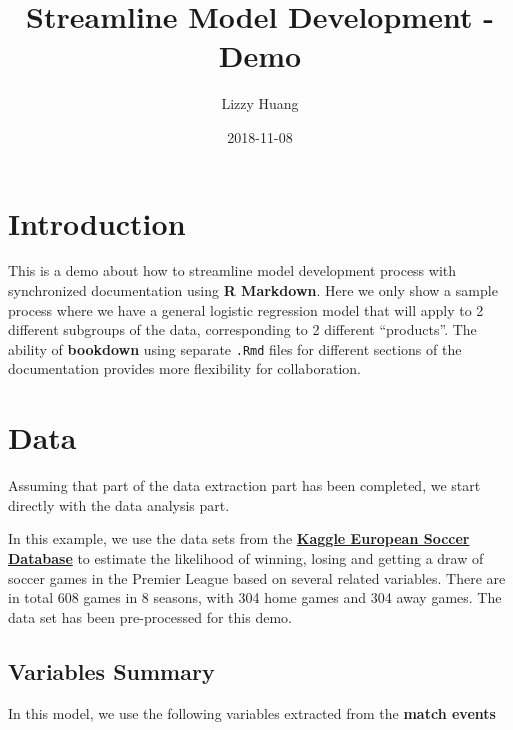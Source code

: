 \documentclass[]{book}
\title{Streamline Model Development - Demo}
\author{Lizzy Huang}
\date{2018-11-08}
\theoremstyle{definition}
\theoremstyle{definition}
\theoremstyle{definition}
\theoremstyle{remark}
\begin{document}
\maketitle

{
\setcounter{tocdepth}{1}
\tableofcontents
}
\chapter{Introduction}\label{introduction}

This is a demo about how to streamline model development process with
synchronized documentation using \textbf{R Markdown}. Here we only show
a sample process where we have a general logistic regression model that
will apply to 2 different subgroups of the data, corresponding to 2
different ``products''. The ability of \textbf{bookdown} using separate
\texttt{.Rmd} files for different sections of the documentation provides
more flexibility for collaboration.

\chapter{Data}\label{data}

Assuming that part of the data extraction part has been completed, we
start directly with the data analysis part.

In this example, we use the data sets from the
\href{https://www.kaggle.com/hugomathien/soccer}{\textbf{Kaggle European
Soccer Database}} to estimate the likelihood of winning, losing and
getting a draw of soccer games in the Premier League based on several
related variables. There are in total 608 games in 8 seasons, with 304
home games and 304 away games. The data set has been pre-processed for
this demo.

\section{Variables Summary}\label{variables-summary}

In this model, we use the following variables extracted from the
\textbf{match events}
\end{document}
